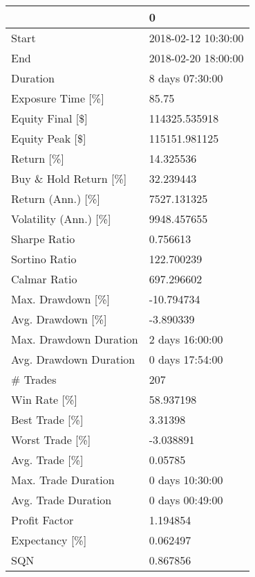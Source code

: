\begin{tabular}{ll}
\toprule
{} &                    0 \\
\midrule
Start                  &  2018-02-12 10:30:00 \\
End                    &  2018-02-20 18:00:00 \\
Duration               &      8 days 07:30:00 \\
Exposure Time [\%]      &                85.75 \\
Equity Final [\$]       &        114325.535918 \\
Equity Peak [\$]        &        115151.981125 \\
Return [\%]             &            14.325536 \\
Buy \& Hold Return [\%]  &            32.239443 \\
Return (Ann.) [\%]      &          7527.131325 \\
Volatility (Ann.) [\%]  &          9948.457655 \\
Sharpe Ratio           &             0.756613 \\
Sortino Ratio          &           122.700239 \\
Calmar Ratio           &           697.296602 \\
Max. Drawdown [\%]      &           -10.794734 \\
Avg. Drawdown [\%]      &            -3.890339 \\
Max. Drawdown Duration &      2 days 16:00:00 \\
Avg. Drawdown Duration &      0 days 17:54:00 \\
\# Trades               &                  207 \\
Win Rate [\%]           &            58.937198 \\
Best Trade [\%]         &              3.31398 \\
Worst Trade [\%]        &            -3.038891 \\
Avg. Trade [\%]         &              0.05785 \\
Max. Trade Duration    &      0 days 10:30:00 \\
Avg. Trade Duration    &      0 days 00:49:00 \\
Profit Factor          &             1.194854 \\
Expectancy [\%]         &             0.062497 \\
SQN                    &             0.867856 \\
\bottomrule
\end{tabular}
